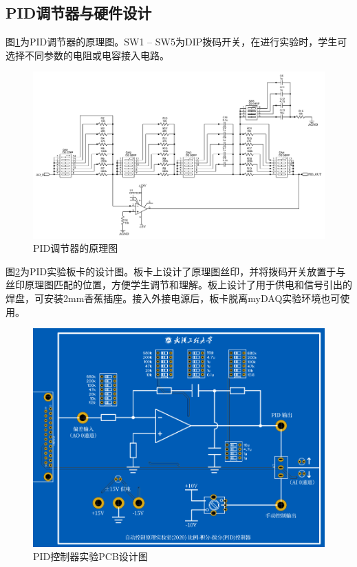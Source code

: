 \documentclass[11pt,a4paper]{article}
\begin{document}
\subsection{PID调节器与硬件设计}
图\ref{pid_sch}为PID调节器的原理图。SW1 -- SW5为DIP拨码开关，在进行实验时，学生可选择不同参数的电阻或电容接入电路。

\begin{figure}[h!]\centering
  \includegraphics[width=14cm]{./figs/pid_sch.pdf}
  \caption{PID调节器的原理图}\label{pid_sch}
\end{figure}

图\ref{pid_board}为PID实验板卡的设计图。板卡上设计了原理图丝印，并将拨码开关放置于与丝印原理图匹配的位置，方便学生调节和理解。板上设计了用于供电和信号引出的焊盘，可安装2mm香蕉插座。接入外接电源后，板卡脱离myDAQ实验环境也可使用。

\begin{figure}[h!]\centering
  \includegraphics[width=14cm]{./figs/pid_board.png}
  \caption{PID控制器实验PCB设计图}\label{pid_board}
\end{figure}
\end{document}
